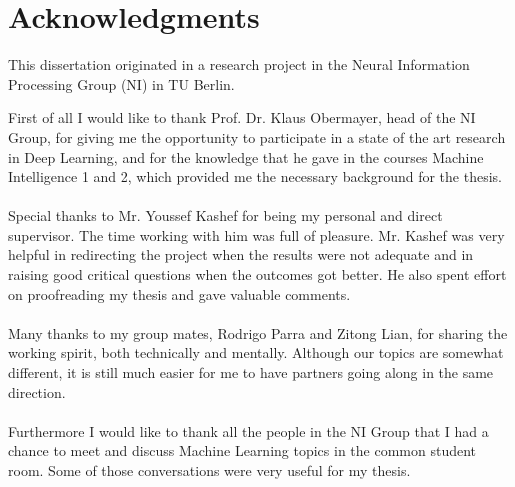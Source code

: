 


\chapter*{Acknowledgments}

\noindent This dissertation originated in a research project in the Neural Information
Processing Group (NI) in TU Berlin.

\vspace*{1cm}
\noindent 
First of all I would like to thank Prof. Dr. Klaus Obermayer, head of the NI Group, for
giving me the opportunity to participate in a state of the art research in Deep Learning,
and for the knowledge that he gave in the courses Machine Intelligence 1 and 2, which
provided me the necessary background for the thesis.
\\ 
\\
Special thanks to Mr. Youssef Kashef for being my personal and direct supervisor. The time
working with him was full of pleasure. Mr. Kashef was very helpful in redirecting the
project when the results were not adequate and in raising good critical questions when
the outcomes got better. He also spent effort on proofreading my thesis and gave valuable
comments.
\\
\\ 
Many thanks to my group mates, Rodrigo Parra and Zitong Lian, for sharing the working
spirit, both technically and mentally. Although our topics are somewhat different, it is
still much easier for me to have partners going along in the same direction.
\\ 
\\
Furthermore I would like to thank all the people in the NI Group that I had a chance to
meet and discuss Machine Learning topics in the common student room. Some of those
conversations were very useful for my thesis.
